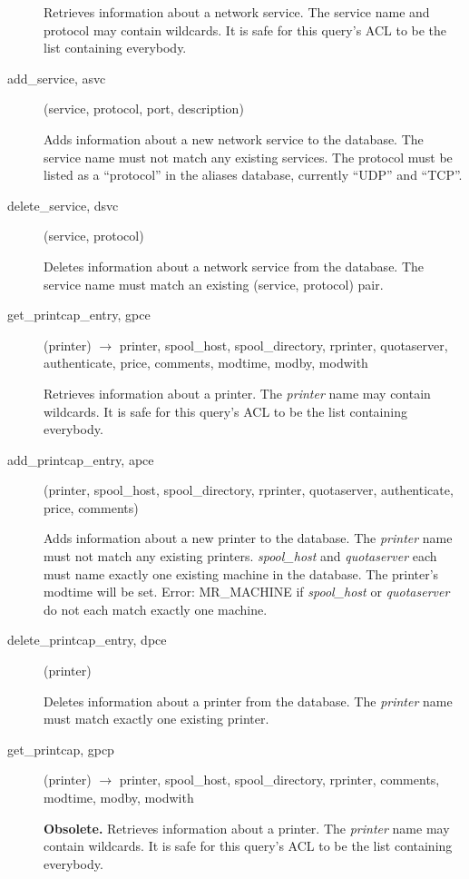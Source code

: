 \documentclass{article}
\begin{document}
\begin{description}
Retrieves information about a network service.  The service name and
protocol may contain wildcards.  It is safe for this query's ACL to be
the list containing everybody.

\item[add\_service, asvc](service, protocol, port, description)

Adds information about a new network service to the database.  The
service name must not match any existing services.  The protocol must
be listed as a ``protocol'' in the aliases database, currently ``UDP'' and
``TCP''.

\item[delete\_service, dsvc](service, protocol)

Deletes information about a network service from the database.  The
service name must match an existing (service, protocol) pair.

\item[get\_printcap\_entry, gpce](printer) $\rightarrow$ printer, spool\_host,
spool\_directory, rprinter, quotaserver, authenticate, price, comments,
modtime, modby, modwith

Retrieves information about a printer.  The {\em printer} name may
contain wildcards.  It is safe for this query's ACL to be the list
containing everybody.

\item[add\_printcap\_entry, apce](printer, spool\_host, spool\_directory,
rprinter, quotaserver, authenticate, price, comments)

Adds information about a new printer to the database.  The {\em printer}
name must not match any existing printers.  {\em spool\_host} and
{\em quotaserver} each must name exactly one existing machine in the
database.  The printer's modtime will be set.  Error: MR\_MACHINE if
{\em spool\_host} or {\em quotaserver} do not each match exactly one
machine.

\item[delete\_printcap\_entry, dpce](printer)

Deletes information about a printer from the database.  The
{\em printer} name must match exactly one existing printer.

\item[get\_printcap, gpcp](printer) $\rightarrow$ printer, spool\_host,
spool\_directory, rprinter, comments, modtime, modby, modwith

{\bf Obsolete.}
Retrieves information about a printer.  The {\em printer} name may
contain wildcards.  It is safe for this query's ACL to be the list
containing everybody.


\end{description}
\end{document}
